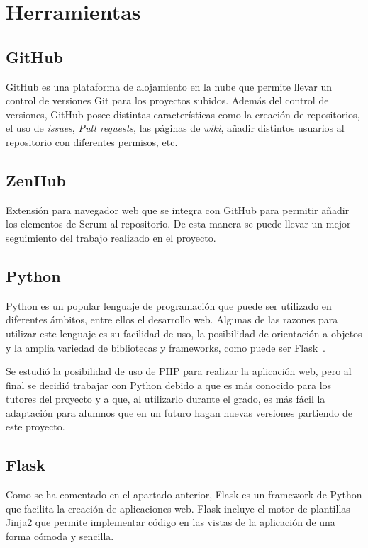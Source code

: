  
\section{Herramientas}
\subsection{GitHub}
GitHub es una plataforma de alojamiento en la nube que permite llevar un control de versiones Git para los proyectos subidos. Además del control de versiones, GitHub posee distintas características como la creación de repositorios, el uso de \textit{issues}, \textit{Pull requests}, las páginas de \textit{wiki}, añadir distintos usuarios al repositorio con diferentes permisos, etc\cite{wiki:github}.

\subsection{ZenHub}
Extensión para navegador web que se integra con GitHub para permitir añadir los elementos de Scrum al repositorio. De esta manera se puede llevar un mejor seguimiento del trabajo realizado en el proyecto.

\subsection{Python}
Python es un popular lenguaje de programación que puede ser utilizado en diferentes ámbitos, entre ellos el desarrollo web. Algunas de las razones para utilizar este lenguaje es su facilidad de uso, la posibilidad de orientación a objetos y la amplia variedad de bibliotecas y frameworks, como puede ser Flask~\cite{python}.

Se estudió la posibilidad de uso de PHP para realizar la aplicación web, pero al final se decidió trabajar con Python debido a que es más conocido para los tutores del proyecto y a que, al utilizarlo durante el grado, es más fácil la adaptación para alumnos que en un futuro hagan nuevas versiones partiendo de este proyecto.

\subsection{Flask}
Como se ha comentado en el apartado anterior, Flask es un framework de Python que facilita la creación de aplicaciones web. Flask incluye el motor de plantillas Jinja2 que permite implementar código en las vistas de la aplicación de una forma cómoda y sencilla.

